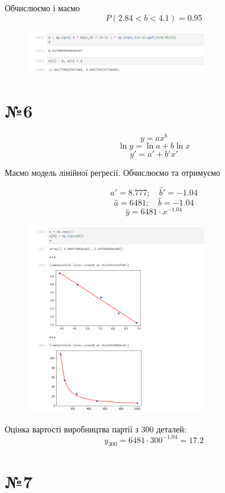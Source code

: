 \documentclass[11pt, a4paper]{article} %
\begin{document}
Обчислюємо і маємо
$$P(2.84 < b < 4.1) = 0.95$$

\begin{figure}[h]
    \centering
    \includegraphics[width=0.7\textwidth]{task5.d.png}
\end{figure}

\pagebreak
\section*{№6}

$$y = ax^b$$
$$\ln y = \ln a + b \ln x$$
$$y' = a' + b' x'$$

Маємо модель лінійної регресії.
Обчислюємо та отримуємо

$$\hat a' = 8.777; \quad \hat b' = -1.04$$
$$\hat a = 6481; \quad \hat b = -1.04$$
$$\hat y = 6481 \cdot x ^ {-1.04}$$

\begin{figure}[h]
    \centering
    \includegraphics[width=0.7\textwidth]{task6.png}
\end{figure}

Оцінка вартості виробництва партії з 300 деталей:
$$y_{300} = 6481 \cdot 300 ^ {-1.04} = 17.2$$

\pagebreak

\section*{№7}
\end{document}
